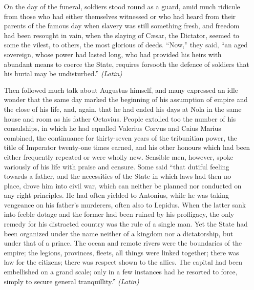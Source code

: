 On the day of the funeral, soldiers stood round as a guard, amid much ridicule from those who had either themselves witnessed or who had heard from their parents of the famous day when slavery was still something fresh, and freedom had been resought in vain, when the slaying of Cæsar, the Dictator, seemed to some the vilest, to others, the most glorious of deeds. ``Now,'' they said, ``an aged sovereign, whose power had lasted long, who had provided his heirs with abundant means to coerce the State, requires forsooth the defence of soldiers that his burial may be undisturbed.'' \emph{(Latin)}


Then followed much talk about Augustus himself, and many expressed an idle wonder that the same day marked the beginning of his assumption of empire and the close of his life, and, again, that he had ended his days at Nola in the same house and room as his father Octavius. People extolled too the number of his consulships, in which he had equalled Valerius Corvus and Caius Marius combined, the continuance for thirty-seven years of the tribunitian power, the title of Imperator twenty-one times earned, and his other honours which had been either frequently repeated or were wholly new. Sensible men, however, spoke variously of his life with praise and censure. Some said ``that dutiful feeling towards a father, and the necessities of the State in which laws had then no place, drove him into civil war, which can neither be planned nor conducted on any right principles. He had often yielded to Antonius, while he was taking vengeance on his father's murderers, often also to Lepidus. When the latter sank into feeble dotage and the former had been ruined by his profligacy, the only remedy for his distracted country was the rule of a single man. Yet the State had been organized under the name neither of a kingdom nor a dictatorship, but under that of a prince. The ocean and remote rivers were the boundaries of the empire; the legions, provinces, fleets, all things were linked together; there was law for the citizens; there was respect shown to the allies. The capital had been embellished on a grand scale; only in a few instances had he resorted to force, simply to secure general tranquillity.'' \emph{(Latin)}


